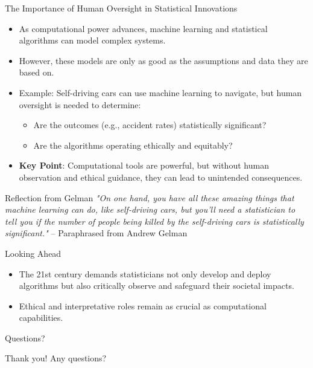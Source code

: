 \documentclass{beamer}
\begin{document}
\begin{frame}{The Importance of Human Oversight in Statistical Innovations}
\begin{itemize}
    \item As computational power advances, machine learning and statistical algorithms can model complex systems.
    \item However, these models are only as good as the assumptions and data they are based on.
    \item Example: Self-driving cars can use machine learning to navigate, but human oversight is needed to determine:
    \begin{itemize}
        \item Are the outcomes (e.g., accident rates) statistically significant?
        \item Are the algorithms operating ethically and equitably?
    \end{itemize}
    \item \textbf{Key Point}: Computational tools are powerful, but without human observation and ethical guidance, they can lead to unintended consequences.
\end{itemize}

\begin{block}{Reflection from Gelman}
\textit{"On one hand, you have all these amazing things that machine learning can do, like self-driving cars, but you'll need a statistician to tell you if the number of people being killed by the self-driving cars is statistically significant."} – Paraphrased from Andrew Gelman
\end{block}

\begin{block}{Looking Ahead}
\begin{itemize}
    \item The 21st century demands statisticians not only develop and deploy algorithms but also critically observe and safeguard their societal impacts.
    \item Ethical and interpretative roles remain as crucial as computational capabilities.
\end{itemize}
\end{block}
\end{frame}



\begin{frame}{Questions?}
\begin{center}
    Thank you! Any questions?
\end{center}
\end{frame}
\end{document}
